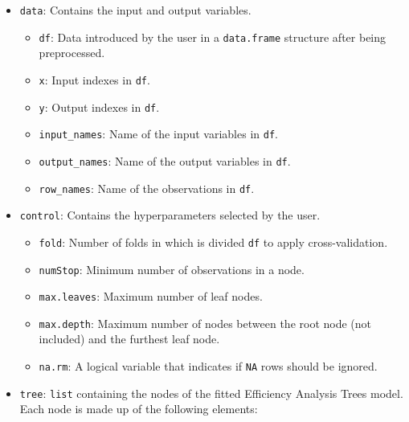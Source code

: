 \begin{itemize}
\tightlist
\item
  \texttt{data}: Contains the input and output variables.

  \begin{itemize}
  \tightlist
  \item
    \texttt{df}: Data introduced by the user in a \texttt{data.frame}
    structure after being preprocessed.
  \item
    \texttt{x}: Input indexes in \texttt{df}.
  \item
    \texttt{y}: Output indexes in \texttt{df}.
  \item
    \texttt{input\_names}: Name of the input variables in \texttt{df}.
  \item
    \texttt{output\_names}: Name of the output variables in \texttt{df}.
  \item
    \texttt{row\_names}: Name of the observations in \texttt{df}.
  \end{itemize}
\item
  \texttt{control}: Contains the hyperparameters selected by the user.

  \begin{itemize}
  \tightlist
  \item
    \texttt{fold}: Number of folds in which is divided \texttt{df} to
    apply cross-validation.
  \item
    \texttt{numStop}: Minimum number of observations in a node.
  \item
    \texttt{max.leaves}: Maximum number of leaf nodes.
  \item
    \texttt{max.depth}: Maximum number of nodes between the root node
    (not included) and the furthest leaf node.
  \item
    \texttt{na.rm}: A logical variable that indicates if \texttt{NA}
    rows should be ignored.
  \end{itemize}
\item
  \texttt{tree}: \texttt{list} containing the nodes of the fitted
  Efficiency Analysis Trees model. Each node is made up of the following
  elements:


\end{itemize}
